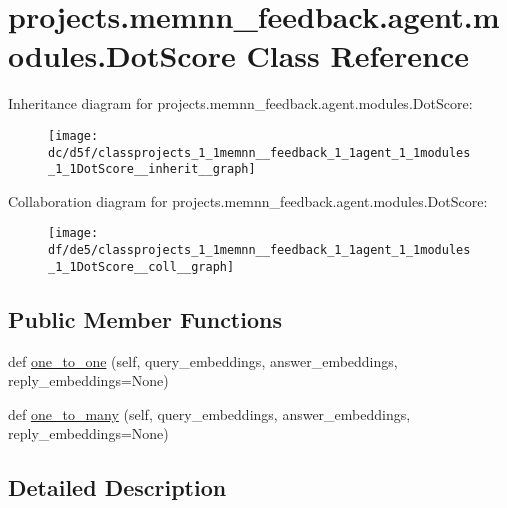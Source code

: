 \hypertarget{classprojects_1_1memnn__feedback_1_1agent_1_1modules_1_1DotScore}{}\section{projects.\+memnn\+\_\+feedback.\+agent.\+modules.\+Dot\+Score Class Reference}
\label{classprojects_1_1memnn__feedback_1_1agent_1_1modules_1_1DotScore}


Inheritance diagram for projects.\+memnn\+\_\+feedback.\+agent.\+modules.\+Dot\+Score\+:\nopagebreak
\begin{figure}[H]
\begin{center}
\leavevmode
\texttt{[image: dc/d5f/classprojects\_1\_1memnn\_\_feedback\_1\_1agent\_1\_1modules\_1\_1DotScore\_\_inherit\_\_graph]}
\end{center}
\end{figure}


Collaboration diagram for projects.\+memnn\+\_\+feedback.\+agent.\+modules.\+Dot\+Score\+:\nopagebreak
\begin{figure}[H]
\begin{center}
\leavevmode
\texttt{[image: df/de5/classprojects\_1\_1memnn\_\_feedback\_1\_1agent\_1\_1modules\_1\_1DotScore\_\_coll\_\_graph]}
\end{center}
\end{figure}
\subsection*{Public Member Functions}
\begin{DoxyCompactItemize}
\item 
def \hyperlink{classprojects_1_1memnn__feedback_1_1agent_1_1modules_1_1DotScore_aa8bc1b8eefcd08b7e2bf4540a379ad41}{one\+\_\+to\+\_\+one} (self, query\+\_\+embeddings, answer\+\_\+embeddings, reply\+\_\+embeddings=None)
\item 
def \hyperlink{classprojects_1_1memnn__feedback_1_1agent_1_1modules_1_1DotScore_a0c541c0daa225e3a8cf4918068afa591}{one\+\_\+to\+\_\+many} (self, query\+\_\+embeddings, answer\+\_\+embeddings, reply\+\_\+embeddings=None)
\end{DoxyCompactItemize}


\subsection{Detailed Description}


